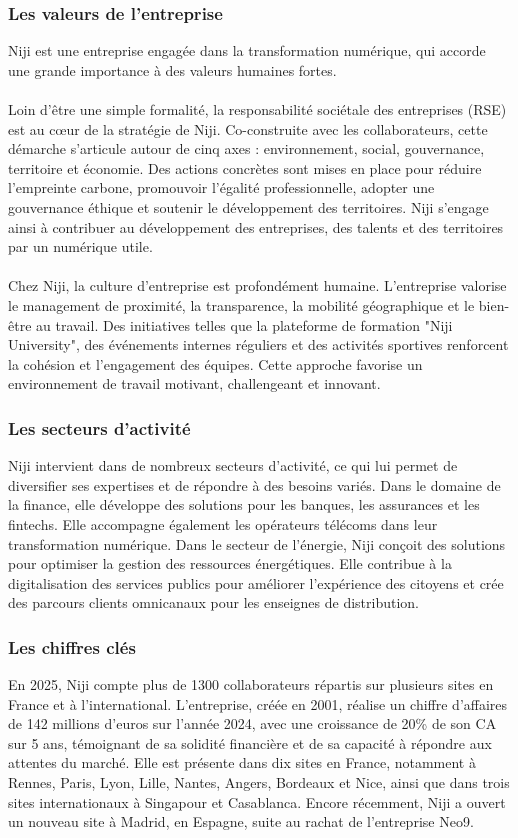\documentclass[12pt]{article}
\begin{document}
\subsubsection{Les valeurs de l'entreprise}
Niji est une entreprise engagée dans la transformation numérique, qui accorde une grande importance à des valeurs humaines fortes.
\\\\
Loin d'être une simple formalité, la responsabilité sociétale des entreprises (RSE) est au cœur de la stratégie de Niji. Co-construite avec les collaborateurs, cette démarche s'articule autour de cinq axes : environnement, social, gouvernance, territoire et économie. Des actions concrètes sont mises en place pour réduire l'empreinte carbone, promouvoir l'égalité professionnelle, adopter une gouvernance éthique et soutenir le développement des territoires. Niji s'engage ainsi à contribuer au développement des entreprises, des talents et des territoires par un numérique utile.
\\\\
Chez Niji, la culture d'entreprise est profondément humaine. L'entreprise valorise le management de proximité, la transparence, la mobilité géographique et le bien-être au travail. Des initiatives telles que la plateforme de formation "Niji University", des événements internes réguliers et des activités sportives renforcent la cohésion et l'engagement des équipes. Cette approche favorise un environnement de travail motivant, challengeant et innovant.

\subsubsection{Les secteurs d'activité}
Niji intervient dans de nombreux secteurs d'activité, ce qui lui permet de diversifier ses expertises et de répondre à des besoins variés. Dans le domaine de la finance, elle développe des solutions pour les banques, les assurances et les fintechs. Elle accompagne également les opérateurs télécoms dans leur transformation numérique. Dans le secteur de l'énergie, Niji conçoit des solutions pour optimiser la gestion des ressources énergétiques. Elle contribue à la digitalisation des services publics pour améliorer l'expérience des citoyens et crée des parcours clients omnicanaux pour les enseignes de distribution.

\subsubsection{Les chiffres clés}
En 2025, Niji compte plus de 1300 collaborateurs répartis sur plusieurs sites en France et à l'international. L'entreprise, créée en 2001, réalise un chiffre d'affaires de 142 millions d'euros sur l'année 2024, avec une croissance de 20\% de son CA sur 5 ans, témoignant de sa solidité financière et de sa capacité à répondre aux attentes du marché. Elle est présente dans dix sites en France, notamment à Rennes, Paris, Lyon, Lille, Nantes, Angers, Bordeaux et Nice, ainsi que dans trois sites internationaux à Singapour et Casablanca. Encore récemment, Niji a ouvert un nouveau site à Madrid, en Espagne, suite au rachat de l'entreprise Neo9.
\end{document}
